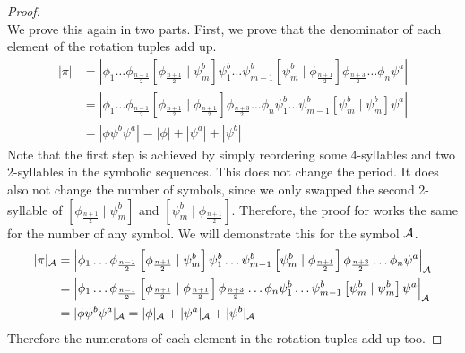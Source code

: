 \begin{proof} \phantom{x} \\
	We prove this again in two parts.
	First, we prove that the denominator of each element of the rotation tuples add up.
	\begin{align*}
		|\pi| & = \left|
		\phi_1 \dots \phi_{\frac{n-1}{2}} \left[\phi_{\frac{n+1}{2}} \mid \psi^b_m\right]
		\psi^b_1 \dots \psi^b_{m-1} \left[\psi^b_m \mid \phi_{\frac{n+1}{2}}\right]
		\phi_{\frac{n+3}{2}} \dots \phi_n \psi^a
		\right|                                                       \\
		      & = \left|
		\phi_1 \dots \phi_{\frac{n-1}{2}} \left[\phi_{\frac{n+1}{2}} \mid \phi_{\frac{n+1}{2}}\right]
		\phi_{\frac{n+3}{2}} \dots \phi_n
		\psi^b_1 \dots \psi^b_{m-1} \left[\psi^b_m \mid \psi^b_m\right]
		\psi^a
		\right|                                                       \\
		      & = |\phi \psi^b \psi^a| = |\phi| + |\psi^a| + |\psi^b|
	\end{align*}
	Note that the first step is achieved by simply reordering some 4-syllables and two 2-syllables in the symbolic sequences.
	This does not change the period.
	It does also not change the number of symbols, since we only swapped the second 2-syllable of $\left[\phi_{\frac{n+1}{2}} \mid \psi^b_m\right]$ and $\left[\psi^b_m \mid \phi_{\frac{n+1}{2}}\right]$.
	Therefore, the proof for works the same for the number of any symbol.
	We will demonstrate this for the symbol $\mathcal{A}$.
	\begin{align*}
		|\pi|_{\mathcal{A}} & = \left|
		\phi_1 \dots \phi_{\frac{n-1}{2}} \left[\phi_{\frac{n+1}{2}} \mid \psi^b_m\right]
		\psi^b_1 \dots \psi^b_{m-1} \left[\psi^b_m \mid \phi_{\frac{n+1}{2}}\right]
		\phi_{\frac{n+3}{2}} \dots \phi_n \psi^a
		\right|_{\mathcal{A}}                                                                   \\
		         & = \left|
		\phi_1 \dots \phi_{\frac{n-1}{2}} \left[\phi_{\frac{n+1}{2}} \mid \phi_{\frac{n+1}{2}}\right]
		\phi_{\frac{n+3}{2}} \dots \phi_n
		\psi^b_1 \dots \psi^b_{m-1} \left[\psi^b_m \mid \psi^b_m\right]
		\psi^a
		\right|_{\mathcal{A}}                                                                   \\
		         & = |\phi \psi^b \psi^a|_{\mathcal{A}} = |\phi|_{\mathcal{A}} + |\psi^a|_{\mathcal{A}} + |\psi^b|_{\mathcal{A}}
	\end{align*}
	Therefore the numerators of each element in the rotation tuples add up too.


\end{proof}
